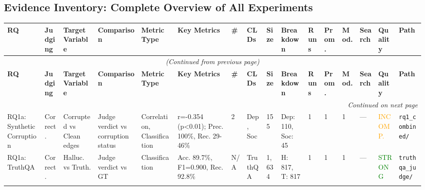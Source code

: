 
\begin{landscape}

\section*{Evidence Inventory: Complete Overview of All Experiments}

{\footnotesize
\begin{longtable}{@{}p{1.8cm}p{1.2cm}p{1.5cm}p{1.8cm}p{1.2cm}p{2.8cm}p{0.5cm}p{1.5cm}p{1cm}p{2cm}p{0.6cm}p{0.6cm}p{0.8cm}p{1.5cm}p{1.2cm}p{2cm}@{}}
\toprule
\textbf{RQ} & \textbf{Judging} & \textbf{Target Variable} & \textbf{Comparison} & \textbf{Metric Type} & \textbf{Key Metrics} & \textbf{\#} & \textbf{CLDs} & \textbf{Size} & \textbf{Breakdown} & \textbf{Runs} & \textbf{Prom.} & \textbf{Mod.} & \textbf{Search} & \textbf{Quality} & \textbf{Path} \\
\midrule
\endfirsthead

\multicolumn{16}{c}{\textit{(Continued from previous page)}} \\
\toprule
\textbf{RQ} & \textbf{Judging} & \textbf{Target Variable} & \textbf{Comparison} & \textbf{Metric Type} & \textbf{Key Metrics} & \textbf{\#} & \textbf{CLDs} & \textbf{Size} & \textbf{Breakdown} & \textbf{Runs} & \textbf{Prom.} & \textbf{Mod.} & \textbf{Search} & \textbf{Quality} & \textbf{Path} \\
\midrule
\endhead

\midrule
\multicolumn{16}{r}{\textit{Continued on next page}} \\
\endfoot

\bottomrule
\endlastfoot

RQ1a: Synthetic Corruption & Correct. & Corrupted vs Clean edges & Judge verdict vs corruption status & Correlation, Classification & r=-0.354 (p<0.01); Prec. 100\%, Rec. 29-46\% & 2 & Dep, Soc & 155 & Dep: 110, Soc: 45 & 1 & 1 & 1 & --- & \textcolor{orange}{INCOMP.} & \texttt{rq1\_combined/} \\
\addlinespace

RQ1a: TruthQA & Correct. & Halluc. vs Truth. & Judge verdict vs GT & Classification & Acc. 89.7\%, F1=0.900, Rec. 92.8\% & N/A & TruthQA & 1,634 & H: 817, T: 817 & 1 & 1 & 1 & --- & \textcolor{green}{STRONG} & \texttt{truthqa\_judge/} \\
\addlinespace


\end{longtable}}
\end{landscape}
